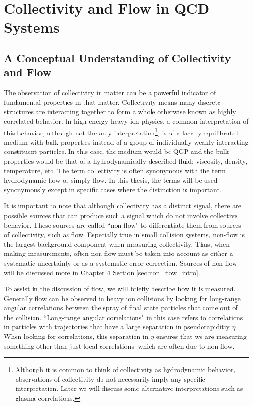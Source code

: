 \chapter{Collectivity and Flow in QCD Systems}
\section{A Conceptual Understanding of Collectivity and Flow}
The observation of collectivity in matter can be a powerful indicator of fundamental properties in that matter. Collectivity means many discrete structures are interacting together to form a whole otherwise known as highly correlated behavior. In high energy heavy ion physics, a common interpretation of this behavior, although not the only interpretation\footnote{Although it is common to think of collectivity as hydrodynamic behavior, observations of collectivity do not necessarily imply any specific interpretation. Later we will discuss some alternative interpretations such as glasma correlations.}, is of a locally equilibrated medium with bulk properties instead of a group of individually weakly interacting constituent particles. In this case, the medium would be QGP and the bulk properties would be that of a hydrodynamically described fluid: viscosity, density, temperature, etc. The term collectivity is often synonymous with the term hydrodynamic flow or simply flow. In this thesis, the terms will be used synonymously except in specific cases where the distinction is important.

It is important to note that although collectivity has a distinct signal, there are possible sources that can produce such a signal which do not involve collective behavior. These sources are called ``non-flow" to differentiate them from sources of collectivity, such as flow. Especially true in small collision systems, non-flow is the largest background component when measuring collectivity. Thus, when making measurements, often non-flow must be taken into account as either a systematic uncertainty or as a systematic error correction. Sources of non-flow will be discussed more in Chapter 4 Section \ref{sec:non_flow_intro}. 

To assist in the discussion of flow, we will briefly describe how it is measured. Generally flow can be observed in heavy ion collisions by looking for long-range angular correlations between the spray of final state particles that come out of the collision. ``Long-range angular correlations" in this case refers to correlations in particles with trajectories that have a large separation in pseudorapiditiy $\eta$. When looking for correlations, this separation in $\eta$ ensures that we are measuring something other than just local correlations, which are often due to non-flow. 


